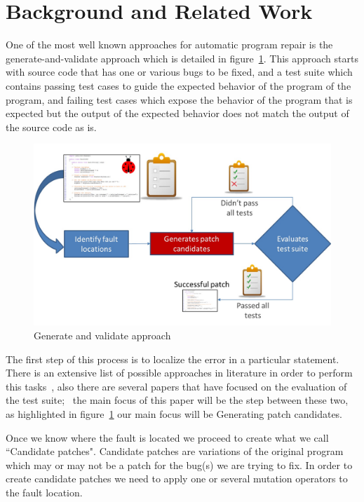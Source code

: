 \documentclass[conference]{IEEEtran}
\begin{document}
\section{Background and Related Work} \label{background}

One of the most well known approaches for automatic program repair is the
generate-and-validate approach which is detailed in figure~\ref{fig:generateandvalidate}. This approach starts with source code that
has one or various bugs to be fixed, and a test suite which contains passing
test cases to guide the expected behavior of the program of the program, and failing test 
cases which expose the behavior of the program that is expected but the output
of the expected behavior does not match the output of the source code as is.



\begin{figure}[!h]
  \centering
    \includegraphics[scale=0.25]{Picture1}
  \caption{Generate and validate approach}
  \label{fig:generateandvalidate}
\end{figure}

The first step of this process is to localize the error in a particular 
statement. There is an extensive list of possible approaches in literature in 
order to perform this tasks~\cite{Jones05,Jones02,Chen02,legoues12,Qi13}, also there are several papers that have focused on the evaluation of the test suite;~\cite{Qi13,fan15} the main focus of this paper will be the step between these two, as highlighted in figure~\ref{fig:generateandvalidate} our main focus will be Generating patch candidates.

Once we know where the fault is located we proceed to create what we call 
``Candidate patches". Candidate patches are variations of the original program 
which may or may not be a patch for the bug(s) we are trying to fix. In order to 
create candidate patches we need to apply one or several mutation operators to 
the fault location. 
\end{document}
